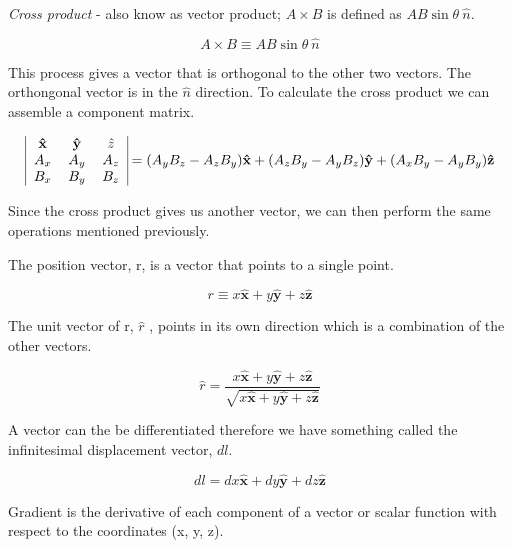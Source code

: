 	\emph{Cross product} - also know as vector product; \( A \times B \) is defined as 
	\( AB\sin{\theta}\ \hat{n}\). 

	\begin{equation}
	A \times B \equiv AB\sin{\theta} \ \hat{n}
	\end{equation}	
	
	This process gives a vector that is orthogonal to the other two vectors. The orthongonal vector is in the $\hat{n}$ direction. To calculate the cross product we can assemble a component matrix.
	
	\begin{equation}
		\begin{tabular}{|ccc|}
			$\mathbf{\hat{x}}$ & $\mathbf{\hat{y}}$ & $\hat{z}$ \\
			$A_x$ & $A_y$ & $A_z$  \\
			$B_x$ & $B_y$  &$B_z $ \\
		\end{tabular}
		= (A_yB_z-A_zB_y)\mathbf{\hat{x}} + (A_zB_y-A_yB_z)\mathbf{\hat{y}} + (A_xB_y-A_yB_y)\mathbf{\hat{z}}
	\end{equation}
	
	Since the cross product gives us another vector, we can then perform the same operations mentioned previously.
	
	The position vector, r, is a vector that points to a single point. 
	
	\begin{equation}
	r \equiv x\mathbf{\hat{x}}+y\mathbf{\hat{y}}+z\mathbf{\hat{z}}
	\end{equation}  
	
	The unit vector of r, \( \hat{r} \) , points in its own direction which is a combination of the other vectors.
	
	\begin{equation}
	\hat{r} = \frac{x\mathbf{\hat{x}}+y\mathbf{\hat{y}}+z\mathbf{\hat{z}}}{\sqrt{x\mathbf{\hat{x}}+y\mathbf{\hat{y}}+z\mathbf{\hat{z}}}}
	\end{equation}	 
	
	\newpage
	A vector can the be differentiated therefore we have something called the infinitesimal displacement vector, \( dl \).
	
	\begin{equation}
	dl = dx\mathbf{\hat{x}}+dy\mathbf{\hat{y}}+dz\mathbf{\hat{z}}
	\end{equation}
	
	Gradient is the derivative of each component of a vector or scalar function with respect to the coordinates (x, y, z). 
	
